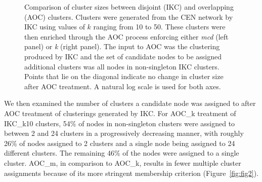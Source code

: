 \documentclass[12pt, oneside]{article}   	%
\begin{document}
\begin{figure}[H]
\begin{subfigure}[t]{0.48\textwidth}
\end{subfigure}
\captionsetup{width=0.9\textwidth}	
\caption{Comparison of cluster sizes between disjoint (IKC)  and overlapping (AOC) clusters. Clusters were generated from the CEN network by IKC using values of $k$ ranging from 10 to 50. These clusters were then enriched through the AOC process enforcing either \emph{mcd} (left panel) or \emph{k} (right panel). The input to AOC was the  clustering produced by 
IKC and the set of candidate nodes to be assigned additional clusters was all nodes in non-singleton IKC clusters.  Points that lie on the diagonal indicate no change in cluster size after AOC treatment. A natural log scale is used for both axes.}
\label{fig:fig1}
\end{figure}
	
We then examined the number of clusters a candidate node was assigned to after AOC treatment of clusterings generated by  IKC. For AOC\_k treatment of IKC\_k10 clusters, 54\% of nodes in non-singleton clusters were assigned to between 2 and 24 clusters in a progressively decreasing manner, with roughly 26\% of nodes assigned to 2 clusters and a single node being assigned to 24 different clusters.  The remaining 46\% of the nodes were assigned to a single cluster. AOC\_m, in comparison to AOC\_k, results in fewer multiple cluster assignments because of its more stringent membership criterion (Figure~\ref{fig:fig2}).
	
\end{document}
